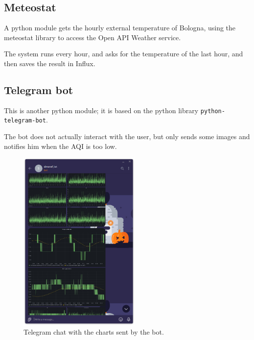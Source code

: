 \documentclass[]{article}
\begin{document}
\subsection{Meteostat}

A python module gets the hourly external temperature of Bologna, using the meteostat library to access the Open API Weather service. 

The system runs every hour, and asks for the temperature of the last hour, and then saves the result in Influx.

\subsection{Telegram bot}\label{teleg_sect}
This is another python module; it is based on the python library \texttt{python-telegram-bot}. 

The bot does not actually interact with the user, but only sends some images and notifies him when the AQI is too low. 

\begin{figure}
	\begin{center}
		\includegraphics[width=6cm]{img/telegram.png}
		\caption{\label{telegram}Telegram chat with the charts sent by the bot.}
	\end{center}
\end{figure}
\end{document}
